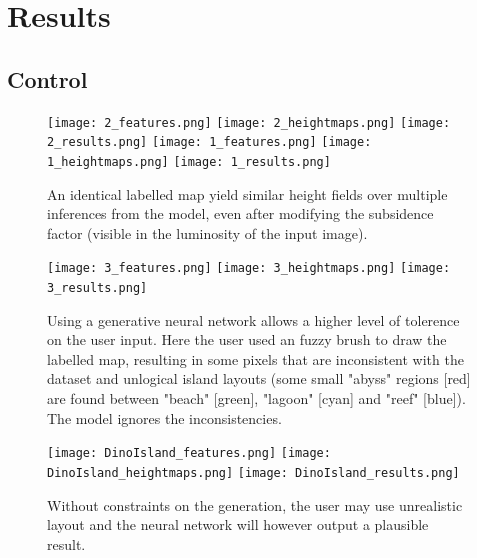 
\section{Results}
\label{sec:coral-island_results}

\subsection{Control}

\begin{figure}[H]
    \texttt{[image: 2\_features.png]}
    \texttt{[image: 2\_heightmaps.png]}
    \texttt{[image: 2\_results.png]} 
    \texttt{[image: 1\_features.png]}
    \texttt{[image: 1\_heightmaps.png]}
    \texttt{[image: 1\_results.png]}
    \caption{An identical labelled map yield similar height fields over multiple inferences from the model, even after modifying the subsidence factor (visible in the luminosity of the input image).}
    \label{fig:coral-island_results1}
\end{figure}
\begin{figure}[H]
    \texttt{[image: 3\_features.png]}
    \texttt{[image: 3\_heightmaps.png]}
    \texttt{[image: 3\_results.png]}
    \caption{Using a generative neural network allows a higher level of tolerence on the user input. Here the user used an fuzzy brush to draw the labelled map, resulting in some pixels that are inconsistent with the dataset and unlogical island layouts (some small "abyss" regions [red] are found between "beach" [green], "lagoon" [cyan] and "reef" [blue]). The model ignores the inconsistencies. }
    \label{fig:coral-island_results2}
\end{figure}
\begin{figure}[H]
    \texttt{[image: DinoIsland\_features.png]}
    \texttt{[image: DinoIsland\_heightmaps.png]}
    \texttt{[image: DinoIsland\_results.png]}
    \caption{Without constraints on the generation, the user may use unrealistic layout and the neural network will however output a plausible result.}
    \label{fig:coral-island_results_dino}
\end{figure}


